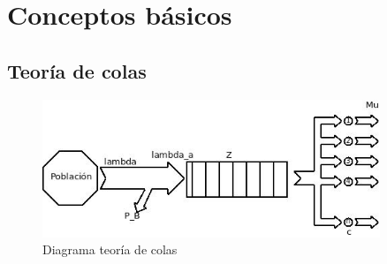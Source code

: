 \section{Conceptos básicos}
\subsection{Teoría de colas}
\begin{figure}[H]
\centering
\includegraphics[width=0.9\textwidth]{Imagen/diateocolas.jpg}
\caption{Diagrama teoría de colas}
\label{dia:teocolas}
\end{figure}

